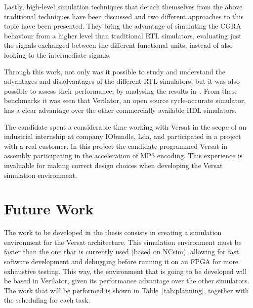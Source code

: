Lastly, high-level simulation techniques that detach themselves from the above
traditional techniques have been discussed and two different approaches to this
topic have been presented. They bring the advantage of simulating the CGRA
behaviour from a higher level than traditional RTL simulators, evaluating just
the signals exchanged between the different functional units, instead of also
looking to the intermediate signals.

Through this work, not only was it possible to study and understand the
advantages and disadvantages of the different RTL simulators, but it was also
possible to assess their performance, by analysing the results in~\cite{verilator:benchmarks,chen:CGRA}. From these benchmarks it was seen that
Verilator, an open source cycle-accurate simulator, has a clear advantage over
the other commercially available HDL simulators.

The candidate spent a considerable time working with Versat in the scope of an
industrial internship at company IObundle, Lda, and participated in a project
with a real customer. In this project the candidate programmed Versat in
assembly participating in the acceleration of MP3 encoding. This experience is
invaluable for making correct design choices when developing the Versat
simulation environment.

\section{Future Work}
\label{section:future}

The work to be developed in the thesis consists in creating a simulation
environment for the Versat architecture. This simulation environment must be
faster than the one that is currently used (based on NCsim), allowing for fast
software development and debugging before running it on an FPGA for more
exhaustive testing. This way, the environment that is going to be developed will
be based in Verilator, given its performance advantage over the other
simulators. The work that will be performed is shown in Table~\ref{tab:planning},
together with the scheduling for each task.


